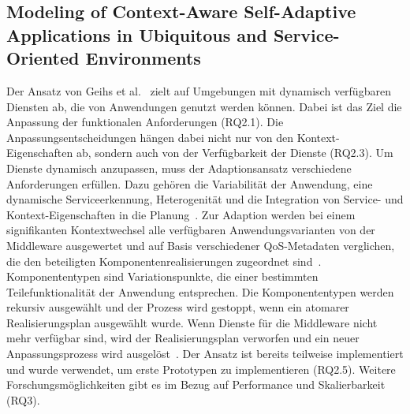 \documentclass[conference,compsoc,ngerman]{IEEEtran}
\begin{document}
\subsection{Modeling of Context-Aware Self-Adaptive Applications in Ubiquitous and Service-Oriented Environments}
Der Ansatz von Geihs et al.~\cite{geihs2009modeling} zielt auf Umgebungen mit dynamisch verfügbaren Diensten ab, die von Anwendungen genutzt werden können. Dabei ist das Ziel die Anpassung der funktionalen Anforderungen (RQ2.1). Die Anpassungsentscheidungen hängen dabei nicht nur von den Kontext-Eigenschaften ab, sondern auch von der Verfügbarkeit der Dienste (RQ2.3). Um Dienste dynamisch anzupassen, muss der Adaptionsansatz verschiedene Anforderungen erfüllen. Dazu gehören die Variabilität der Anwendung, eine dynamische Serviceerkennung, Heterogenität und die Integration von Service- und Kontext-Eigenschaften in die Planung~\cite{geihs2009modeling}.
Zur Adaption werden bei einem signifikanten Kontextwechsel alle verfügbaren Anwendungsvarianten von der Middleware ausgewertet und auf Basis verschiedener QoS-Metadaten verglichen, die den beteiligten Komponentenrealisierungen zugeordnet sind~\cite{geihs2009modeling}. Komponententypen sind Variationspunkte, die einer bestimmten Teilefunktionalität der Anwendung entsprechen. Die Komponententypen werden rekursiv ausgewählt und der Prozess wird gestoppt, wenn ein atomarer Realisierungsplan ausgewählt wurde.
Wenn Dienste für die Middleware nicht mehr verfügbar sind, wird der Realisierungsplan verworfen und ein neuer Anpassungsprozess wird ausgelöst~\cite{geihs2009modeling}.
Der Ansatz ist bereits teilweise implementiert und wurde verwendet, um erste Prototypen zu implementieren (RQ2.5). Weitere Forschungsmöglichkeiten gibt es im Bezug auf Performance und Skalierbarkeit (RQ3).
\end{document}
